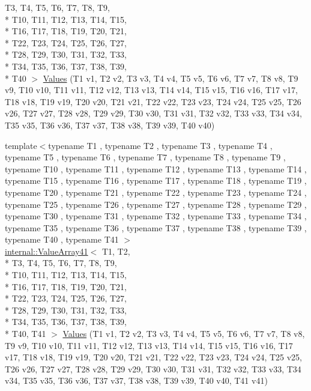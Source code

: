 \begin{DoxyCompactItemize}
T3, T4, T5, T6, T7, T8, T9, \\*
T10, T11, T12, T13, T14, T15, \\*
T16, T17, T18, T19, T20, T21, \\*
T22, T23, T24, T25, T26, T27, \\*
T28, T29, T30, T31, T32, T33, \\*
T34, T35, T36, T37, T38, T39, \\*
T40 $>$ \hyperlink{namespacetesting_adaa8b96d44c103a70e5c4a4b3430ef4d}{Values} (T1 v1, T2 v2, T3 v3, T4 v4, T5 v5, T6 v6, T7 v7, T8 v8, T9 v9, T10 v10, T11 v11, T12 v12, T13 v13, T14 v14, T15 v15, T16 v16, T17 v17, T18 v18, T19 v19, T20 v20, T21 v21, T22 v22, T23 v23, T24 v24, T25 v25, T26 v26, T27 v27, T28 v28, T29 v29, T30 v30, T31 v31, T32 v32, T33 v33, T34 v34, T35 v35, T36 v36, T37 v37, T38 v38, T39 v39, T40 v40)
\item 
{\footnotesize template$<$typename T1 , typename T2 , typename T3 , typename T4 , typename T5 , typename T6 , typename T7 , typename T8 , typename T9 , typename T10 , typename T11 , typename T12 , typename T13 , typename T14 , typename T15 , typename T16 , typename T17 , typename T18 , typename T19 , typename T20 , typename T21 , typename T22 , typename T23 , typename T24 , typename T25 , typename T26 , typename T27 , typename T28 , typename T29 , typename T30 , typename T31 , typename T32 , typename T33 , typename T34 , typename T35 , typename T36 , typename T37 , typename T38 , typename T39 , typename T40 , typename T41 $>$ }\\\hyperlink{classtesting_1_1internal_1_1ValueArray41}{internal\-::\-Value\-Array41}$<$ T1, T2, \\*
T3, T4, T5, T6, T7, T8, T9, \\*
T10, T11, T12, T13, T14, T15, \\*
T16, T17, T18, T19, T20, T21, \\*
T22, T23, T24, T25, T26, T27, \\*
T28, T29, T30, T31, T32, T33, \\*
T34, T35, T36, T37, T38, T39, \\*
T40, T41 $>$ \hyperlink{namespacetesting_a51df725741cfcc9539c48885fc2728b0}{Values} (T1 v1, T2 v2, T3 v3, T4 v4, T5 v5, T6 v6, T7 v7, T8 v8, T9 v9, T10 v10, T11 v11, T12 v12, T13 v13, T14 v14, T15 v15, T16 v16, T17 v17, T18 v18, T19 v19, T20 v20, T21 v21, T22 v22, T23 v23, T24 v24, T25 v25, T26 v26, T27 v27, T28 v28, T29 v29, T30 v30, T31 v31, T32 v32, T33 v33, T34 v34, T35 v35, T36 v36, T37 v37, T38 v38, T39 v39, T40 v40, T41 v41)

\end{DoxyCompactItemize}
